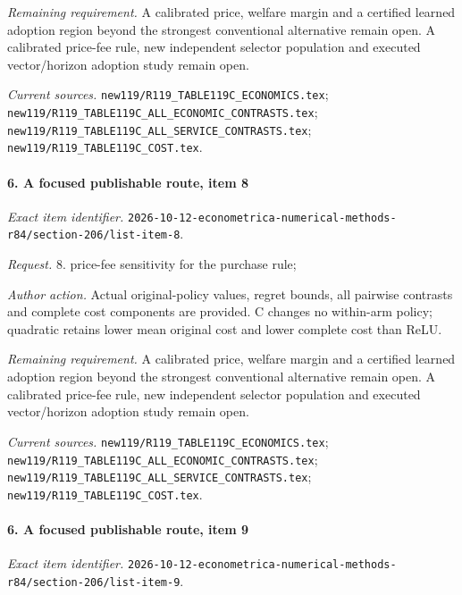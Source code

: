 \par\emph{Remaining requirement.} A calibrated price, welfare margin and a certified learned adoption region beyond the strongest conventional alternative remain open. A calibrated price-fee rule, new independent selector population and executed vector/\allowbreak{}horizon adoption study remain open.

\par\emph{Current sources.} \nolinkurl{new119/R119_TABLE119C_ECONOMICS.tex}; \nolinkurl{new119/R119_TABLE119C_ALL_ECONOMIC_CONTRASTS.tex}; \nolinkurl{new119/R119_TABLE119C_ALL_SERVICE_CONTRASTS.tex}; \nolinkurl{new119/R119_TABLE119C_COST.tex}.

\paragraph{6. A focused publishable route, item 8}

\emph{Exact item identifier.} \nolinkurl{2026-10-12-econometrica-numerical-methods-r84/section-206/list-item-8}.

\par\emph{Request.} 8. price-fee sensitivity for the purchase rule;

\par\emph{Author action.} Actual original-policy values, regret bounds, all pairwise contrasts and complete cost components are provided. C changes no within-arm policy; quadratic retains lower mean original cost and lower complete cost than ReLU.

\par\emph{Remaining requirement.} A calibrated price, welfare margin and a certified learned adoption region beyond the strongest conventional alternative remain open. A calibrated price-fee rule, new independent selector population and executed vector/\allowbreak{}horizon adoption study remain open.

\par\emph{Current sources.} \nolinkurl{new119/R119_TABLE119C_ECONOMICS.tex}; \nolinkurl{new119/R119_TABLE119C_ALL_ECONOMIC_CONTRASTS.tex}; \nolinkurl{new119/R119_TABLE119C_ALL_SERVICE_CONTRASTS.tex}; \nolinkurl{new119/R119_TABLE119C_COST.tex}.

\paragraph{6. A focused publishable route, item 9}

\emph{Exact item identifier.} \nolinkurl{2026-10-12-econometrica-numerical-methods-r84/section-206/list-item-9}.

